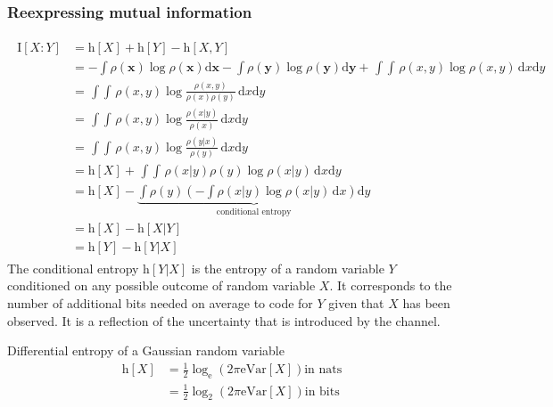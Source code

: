 \subsubsection*{Reexpressing mutual information}
\begin{align}
\begin{split}
	\mathrm{I}[X:Y] &= \mathrm{h}[X] + \mathrm{h}[Y] - \mathrm{h}[X,Y] \\
	                &= - \int \rho (\mathbf{x}) \log \rho(\mathbf{x}) \mathrm{d}\mathbf{x} 
	                   - \int \rho (\mathbf{y}) \log \rho(\mathbf{y}) \mathrm{d}\mathbf{y} 
	                   + \mathop{\int \! \! \! \int} \rho(x,y) \log \rho(x,y) \, \mathrm{d}x \mathrm{d}y \\
	                &= \mathop{\int \! \! \! \int} \rho(x,y) \log \frac{\rho(x,y)}{\rho(x)\rho(y)} \, \mathrm{d}x \mathrm{d}y \\
	                &= \mathop{\int \! \! \! \int} \rho(x,y) \log \frac{\rho(x|y)}{\rho(x)} \, \mathrm{d}x \mathrm{d}y \\
	                &= \mathop{\int \! \! \! \int} \rho(x,y) \log \frac{\rho(y|x)}{\rho(y)} \, \mathrm{d}x \mathrm{d}y \\
	                &= \mathrm{h}[X] + \mathop{\int \! \! \! \int} \rho(x|y) \rho(y) \log \rho(x|y) \, \mathrm{d}x \mathrm{d}y \\
	                &= \mathrm{h}[X] - \underbrace{\int \rho(y) 
	                     \left(- \int \rho(x|y) \log \rho(x|y) \, \mathrm{d}x \right) \mathrm{d}y}_{\text{conditional entropy}} \\
	                &= \mathrm{h}[X] - \mathrm{h}[X|Y] \\
	                &= \mathrm{h}[Y] - \mathrm{h}[Y|X]
\end{split}
\end{align}
The conditional entropy $\mathrm{h}[Y|X]$ is the entropy of a random variable $Y$ conditioned on 
any possible outcome of random variable $X$. It corresponds to the number of additional bits
needed on average to code for $Y$ given that $X$ has been observed. It is a reflection of the uncertainty that
is introduced by the channel.

\begin{exbox}{Differential entropy of a Gaussian random variable}
	\begin{align*}
	\mathrm{h}[X] &= \frac{1}{2} \log_\mathrm{e} \left( 2 \pi \mathrm{e} \mathrm{Var}[X] \right) \text{in nats} \\
				  &= \frac{1}{2} \log_2 \left( 2 \pi \mathrm{e} \mathrm{Var}[X] \right) \text{in bits}
	\end{align*}
\end{exbox}